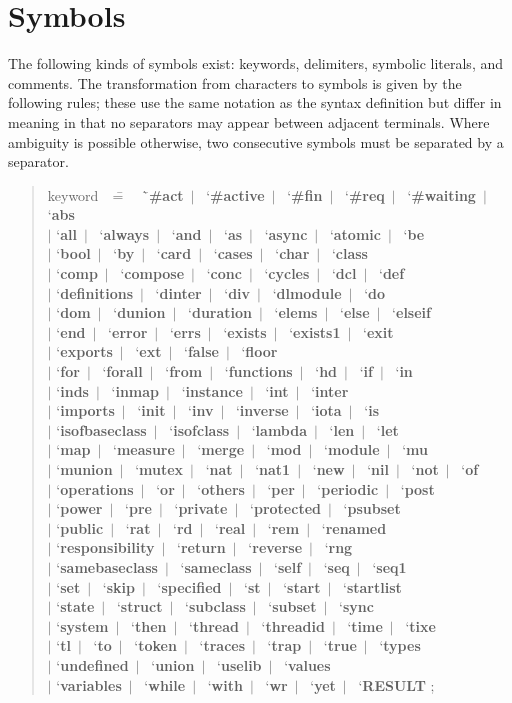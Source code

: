 \documentclass{overturerepchap}
\newcommand{\Rule}[2]{
  \begin{quote}\begin{tabbing}
    #1\index{#1}\ \ \= = \ \ \= #2  ; %
    
  \end{tabbing}\end{quote}
  }
\newcommand{\RuleTarget}[1]{\hypertarget{rule:#1}{}}
\newcommand{\Ruledef}[2]
{
  \RuleTarget{#1}\Rule{#1}{#2}%
  }
\newcommand{\dsepl}{\ $|$\ }
\newcommand{\dsep}{\\ \> $|$ \>}
\newcommand{\Lop}[1]{`{\bf\ttfamily #1}\Quote}
\begin{document}
        

\clearpage %


\section{Symbols}\label{Symbols}

The following kinds of symbols exist: keywords, delimiters,
symbolic literals, and comments.  The transformation from characters to
symbols is given by the following rules; these use the same notation as the
syntax definition but differ in meaning in that no separators may appear
between adjacent terminals.  Where ambiguity is possible otherwise, two
consecutive symbols must be separated by a separator.

\newcommand{\Lks}[1]{\Lop{#1}\dsepl}
\newcommand{\Lksb}[1]{\Lop{#1}\dsep}
\Ruledef{keyword}{
  \Lks{\#act}
  \Lks{\#active}
  \Lks{\#fin}
  \Lks{\#req}
  \Lks{\#waiting}
  \Lksb{abs}
  \Lks{all}
  \Lks{always}
  \Lks{and}
\Lks{as}
  \Lks{async}
  \Lks{atomic}
  \Lksb{be}
  \Lks{bool}
  \Lks{by}
  \Lks{card}
  \Lks{cases}
  \Lks{char}
  \Lksb{class}
  \Lks{comp}
  \Lks{compose} 
  \Lks{conc}
  \Lks{cycles}
  \Lks{dcl}
  \Lksb{def}
  \Lks{definitions}
  \Lks{dinter} 
  \Lks{div}
  \Lks{dlmodule}
  \Lksb{do}
  \Lks{dom}
  \Lks{dunion}
  \Lks{duration}
  \Lks{elems}
  \Lks{else}
  \Lksb{elseif}
  \Lks{end}
  \Lks{error}
  \Lks{errs}
  \Lks{exists}
  \Lks{exists1}
  \Lksb{exit} 
  \Lks{exports}
  \Lks{ext} 
  \Lks{false} 
  \Lksb{floor}
  \Lks{for} 
  \Lks{forall}
  \Lks{from}
  \Lks{functions}
  \Lks{hd} 
  \Lks{if}
  \Lksb{in} 
  \Lks{inds}
  \Lks{inmap}
  \Lks{instance}
  \Lks{int}
  \Lksb{inter}
  \Lks{imports}
  \Lks{init}
  \Lks{inv}
  \Lks{inverse}
  \Lks{iota}
  \Lksb{is}
  \Lks{isofbaseclass}
  \Lks{isofclass}
  \Lks{lambda}
  \Lks{len} 
  \Lksb{let}
  \Lks{map}
  \Lks{measure}
  \Lks{merge} 
  \Lks{mod} 
  \Lks{module}
  \Lksb{mu}
  \Lks{munion}
  \Lks{mutex}
  \Lks{nat}
  \Lks{nat1}
  \Lks{new}
  \Lks{nil} 
  \Lks{not}
  \Lksb{of}
  \Lks{operations}
  \Lks{or}
  \Lks{others}
  \Lks{per}
  \Lks{periodic}
  \Lksb{post}
  \Lks{power} 
  \Lks{pre}
  \Lks{private}
  \Lks{protected}
  \Lksb{psubset}
  \Lks{public}
  \Lks{rat}
  \Lks{rd}
  \Lks{real} 
  \Lks{rem}
  \Lksb{renamed}
  \Lks{responsibility}
  \Lks{return}
  \Lks{reverse}
  \Lksb{rng}
  \Lks{samebaseclass}
  \Lks{sameclass}
  \Lks{self}
  \Lks{seq}
  \Lksb{seq1}
  \Lks{set}
  \Lks{skip}
  \Lks{specified}
  \Lks{st}
  \Lks{start}
  \Lksb{startlist}
  \Lks{state}
  \Lks{struct}
  \Lks{subclass}
  \Lks{subset}
  \Lksb{sync}
  \Lks{system}
  \Lks{then}
  \Lks{thread}
  \Lks{threadid}
  \Lks{time}
  \Lksb{tixe}
  \Lks{tl}
  \Lks{to}
  \Lks{token}
  \Lks{traces}
  \Lks{trap} 
  \Lks{true}
  \Lksb{types}
  \Lks{undefined}
  \Lks{union}
  \Lks{uselib}
  \Lksb{values} 
  \Lks{variables}
  \Lks{while} 
  \Lks{with}
  \Lks{wr}
  \Lks{yet}
  \Lop{RESULT} 
  }
\end{document}
